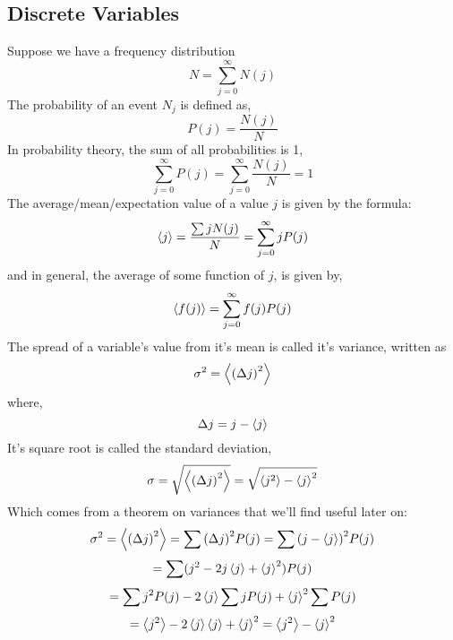 \subsection{Discrete Variables}
Suppose we have a frequency distribution 
\begin{equation}
N = \sum_{j=0}^{\infty} N(j)
\end{equation}
The probability of an event $N_{j}$ is defined as,
\begin{equation}
P(j) = \frac{N(j)}{N}
\end{equation}
In probability theory, the sum of all probabilities is 1,
\begin{equation}
\sum_{j = 0}^{\infty}P(j) = \sum_{j = 0}^{\infty}\frac{N(j)}{N} = 1
\end{equation}
The average/mean/expectation value of a value $j$ is given by the formula:
\begin{equation}
	\expval{j} = \frac{\sum j N(j)}{N} = \sum_{j =0 }^{\infty} j P(j)
\end{equation}
and in general, the average of some function of $j$, is given by,
\begin{equation}
\expval{f(j)} = \sum_{j =0 }^{\infty} f(j) P(j)
\end{equation}
The spread of a variable's value from it's mean is called it's variance, written as
\begin{equation}
\sigma^{2} = \expval{{(\Delta j)}^{2}}
\end{equation}
where,
$$\Delta j = j - \expval{j}$$
It's square root is called the standard deviation,
\begin{equation}
\sigma = \sqrt{\expval{{(\Delta j)}^{2}}} =  \sqrt{\expval{j^{2}} - \expval{j}^{2}}
\end{equation}
Which comes from a theorem on variances that we'll find useful later on:
$$\sigma^{2} = \expval{{(\Delta j)}^{2}} = \sum {(\Delta j)}^{2} P(j) = \sum {(j- \expval{j})}^{2} P(j)$$
$$ = \sum (j^{2} - 2j \expval{j} + \expval{j}^{2}) P(j)$$
$$ = \sum j^{2}P(j) - 2 \expval{j} \sum jP(j) + \expval{j}^{2}\sum P(j)$$
$$ = \expval{j^{2}} - 2 \expval{j}\expval{j} + \expval{j}^{2} = \expval{j^{2}} - \expval{j}^{2}$$
